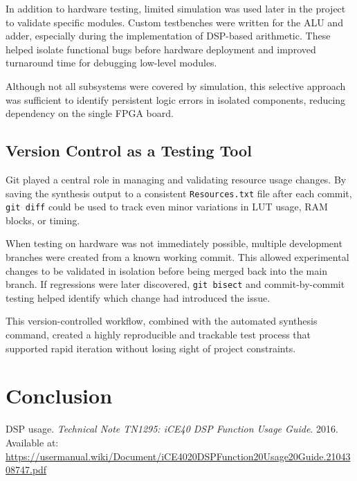 \documentclass[a4paper,10pt]{article}
\begin{document}
In addition to hardware testing, 
limited simulation was used later in the project to validate specific modules. 
Custom testbenches were written for the ALU and adder, 
especially during the implementation of DSP-based arithmetic. 
These helped isolate functional bugs before hardware deployment and 
improved turnaround time for debugging low-level modules.

Although not all subsystems were covered by simulation, 
this selective approach was sufficient to identify persistent logic errors 
in isolated components, reducing dependency on the single FPGA board.

\subsection*{Version Control as a Testing Tool}

Git played a central role in managing and validating resource usage changes. 
By saving the synthesis output to a consistent \texttt{Resources.txt} file 
after each commit, \texttt{git diff} could be used to track even minor variations 
in LUT usage, RAM blocks, or timing.

When testing on hardware was not immediately possible, 
multiple development branches were created from a known working commit. 
This allowed experimental changes to be validated in isolation 
before being merged back into the main branch. 
If regressions were later discovered, \texttt{git bisect} and 
commit-by-commit testing helped identify which change had introduced the issue.

This version-controlled workflow, combined with the automated synthesis command, 
created a highly reproducible and trackable test process that supported 
rapid iteration without losing sight of project constraints.

\section{Conclusion}
\label{sec:Conclusion}

\begin{thebibliography}{9}

DSP usage. \textit{Technical Note TN1295: iCE40 DSP Function Usage Guide}. 
2016. Available at: 
\url{https://usermanual.wiki/Document/iCE4020DSPFunction20Usage20Guide.2104308747.pdf}

\end{thebibliography}
\end{document}
